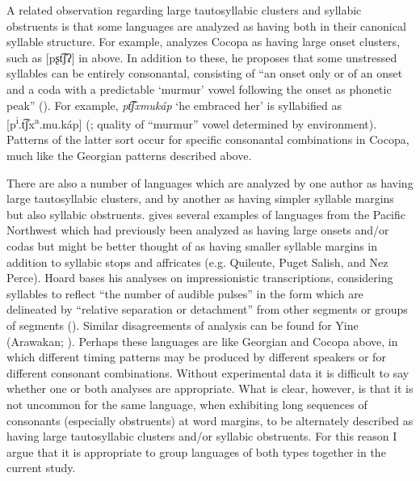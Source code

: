   A related observation regarding large tautosyllabic clusters and syllabic obstruents is that some languages are analyzed as having both in their canonical syllable structure. For example, \citet{Crawford1966} analyzes Cocopa as having large onset clusters, such as [pʂt͡ʃʔ] in  above. In addition to these, he proposes that some unstressed syllables can be entirely consonantal, consisting of “an onset only or of an onset and a coda with a predictable ‘murmur’ vowel following the onset as phonetic peak” (\citeyear[34]{Crawford1966}). For example, \textit{pt͡ʃxmukáp} ‘he embraced her’ is syllabified as [p\textsuperscript{i}.t͡ʃx\textsuperscript{a}.mu.káp]  (\citeyear[43]{Crawford1966}; quality of ``murmur'' vowel determined by environment). Patterns of the latter sort occur for specific consonantal combinations in Cocopa, much like the Georgian patterns described above. 

  There are also a number of languages which are analyzed by one author as having large tautosyllabic clusters, and by another as having simpler syllable margins but also syllabic obstruents. \citet{Hoard1978} gives several examples of languages from the Pacific Northwest which had previously been analyzed as having large onsets and/or codas but might be better thought of as having smaller syllable margins in addition to syllabic stops and affricates (e.g. Quileute, Puget Salish, and Nez Perce). Hoard bases his analyses on impressionistic transcriptions, considering syllables to reflect “the number of audible pulses” in the form which are delineated by “relative separation or detachment” from other segments or groups of segments (\citeyear[59--60]{Hoard1978}). Similar disagreements of analysis can be found for Yine (Arawakan; \citealt{Matteson1965,Lin1997,Hanson2010}). Perhaps these languages are like Georgian and Cocopa above, in which different timing patterns may be produced by different speakers or for different consonant combinations. Without experimental data it is difficult to say whether one or both analyses are appropriate. What is clear, however, is that it is not uncommon for the same language, when exhibiting long sequences of consonants (especially obstruents) at word margins, to be alternately described as having large tautosyllabic clusters and/or syllabic obstruents. For this reason I argue that it is appropriate to group languages of both types together in the current study.

